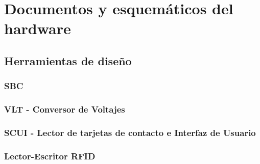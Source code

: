 \chapter{Documentos y esquem\'aticos del hardware}

\section{Herramientas de diseño}
\subsection{SBC}
\subsection{VLT - Conversor de Voltajes}
\subsection{SCUI - Lector de tarjetas de contacto e Interfaz de Usuario}
\subsection{Lector-Escritor RFID}

